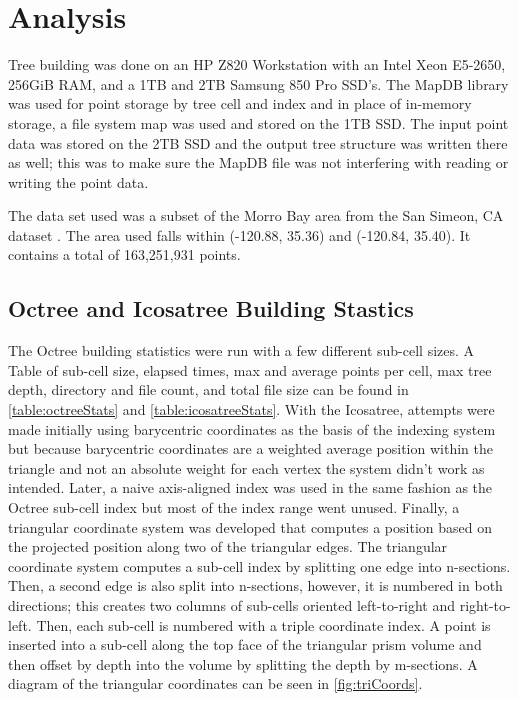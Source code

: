 \chapter{Analysis}

Tree building was done on an HP Z820 Workstation with an Intel Xeon E5-2650,
256GiB RAM, and a 1TB and 2TB Samsung 850 Pro SSD’s. The MapDB library was used
for point storage by tree cell and index and in place of in-memory storage, a
file system map was used and stored on the 1TB SSD. The input point data was
stored on the 2TB SSD and the output tree structure was written there as well;
this was to make sure the MapDB file was not interfering with reading or writing
the point data.

The data set used was a subset of the Morro Bay area from the San Simeon, CA
dataset \cite{15_opentopo_morrobay}. The area used falls within (-120.88, 35.36)
and (-120.84, 35.40).
It contains a total of 163,251,931 points.

\section{Octree and Icosatree Building Stastics}

The Octree building statistics were run with a few different sub-cell sizes. A
Table of sub-cell size, elapsed times, max and average points per cell, max tree
depth, directory and file count, and total file size can be found in
\ref{table:octreeStats} and \ref{table:icosatreeStats}. With the Icosatree,
attempts were made initially using barycentric coordinates as the basis of the
indexing system but because barycentric coordinates are a weighted average
position within the triangle and not an absolute weight for each vertex the
system didn’t work as intended. Later, a naive axis-aligned index was used in
the same fashion as the Octree sub-cell index but most of the index range went
unused. Finally, a triangular coordinate system was developed that computes a
position based on the projected position along two of the triangular edges. The
triangular coordinate system computes a sub-cell index by splitting one edge
into n-sections. Then, a second edge is also split into n-sections, however, it
is numbered in both directions; this creates two columns of sub-cells oriented
left-to-right and right-to-left. Then, each sub-cell is numbered with a triple
coordinate index. A point is inserted into a sub-cell along the top face of the
triangular prism volume and then offset by depth into the volume by splitting
the depth by m-sections. A diagram of the triangular coordinates can be seen in
\ref{fig:triCoords}.

